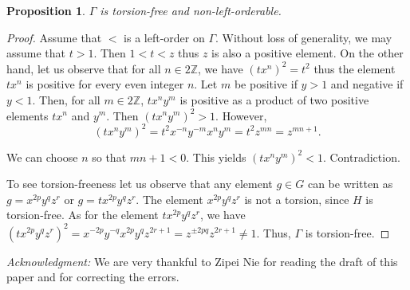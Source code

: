 \documentclass[12pt]{amsart}
\newtheorem{prop}[thm]{Proposition}
\theoremstyle{definition}
\newcommand{\blackboard}[1]{\ensuremath{\mathbb{#1}}}
\newcommand{\Z}{\blackboard{Z}}
\begin{document}
 \medskip
 
 \begin{prop} $\Gamma $ is torsion-free and non-left-orderable.  
 \end{prop}
 
 \begin{proof} Assume that $<$ is a left-order on $\Gamma $. Without loss of generality, we may assume that $t > 1$. Then $1 < t < z$ thus $z$ is also a positive element. On the other hand, let us observe that for all $n\in 2\Z $, we have $(tx^n)^2 = t^2$ thus the element $tx^n$ is positive for every even integer $n$. Let $m$ be positive if $y > 1$ and negative if $y < 1$. Then, for all $m\in 2\Z$, $tx^ny^m$ is positive as a product of two positive elements $tx^n$ and $y^m$. Then $(tx^ny^m)^2 > 1$. However, $$(tx^ny^m)^2 = t^2x^{-n}y^{-m}x^ny^m = t^2z^{mn} = z^{mn+1}.$$
 
 We can choose $n$ so that $mn + 1 < 0$. This yields $(tx^ny^m)^2 < 1$. Contradiction.
 
 \medskip
 
 To see torsion-freeness let us observe that any element $g\in G$ can be written as $g = x^{2p}y^qz^r$ or $g = tx^{2p}y^qz^r$. The element $x^{2p}y^qz^r$ is not a torsion, since $H$ is torsion-free. As for the element $tx^{2p}y^qz^r$, we have $(tx^{2p}y^qz^r)^2 = x^{-2p}y^{-q}x^{2p}y^qz^{2r+1} = z^{\pm 2pq}z^{2r+1} \neq 1.$ Thus, $\Gamma $ is torsion-free.
  \end{proof}
  
 \medskip

{\em Acknowledgment: } We are very thankful to Zipei Nie for reading the draft of this paper and for correcting the errors. 
 
  
   \bigskip
 
\end{document}
